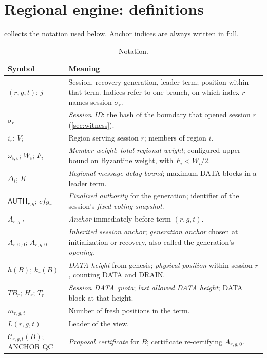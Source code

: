 \documentclass[11pt,a4paper]{article}
\newcommand{\QC}{\mathcal C}
\newcommand{\TB}{\mathit{TB}}
\newcommand{\tagg}[1]{\ensuremath{\mathsf{#1}}}
\newcommand{\defterm}[1]{\textcolor{rrBlue}{\textit{#1}}}
\begin{document}
\section{Regional engine: definitions}
\label{sec:regional}

 collects the notation used below. Anchor indices
are always written in full.
\begin{table}[htbp]\centering\small
\caption{Notation.}\label{tab:notation}
\begin{tabularx}{\linewidth}{@{}p{.29\linewidth}Y@{}}
\toprule Symbol & Meaning\\\midrule
$(r,g,t)$; $j$ & Session, recovery generation, leader term; position
within that term. Indices refer to one branch, on which index $r$ names session $\sigma_r$.\\
$\sigma_r$ & \defterm{Session ID}: the hash of the boundary that opened
session $r$ (\cref{sec:witness}).\\
$i_r$; $V_i$ & Region serving session $r$; members of region $i$.\\
$\omega_{i,v}$; $W_i$; $F_i$ & \defterm{Member weight}; \defterm{total regional weight};
configured upper bound on Byzantine weight, with $F_i<W_i/2$.\\
$\Delta_i$; $K$ & \defterm{Regional message-delay bound}; maximum DATA blocks
in a leader term.\\
$\tagg{AUTH}_{r,g}$; $\mathit{cfg}_r$ & \defterm{Finalized authority} for the
generation; identifier of the session's \defterm{fixed voting snapshot}.\\
$A_{r,g,t}$ & \defterm{Anchor} immediately before term $(r,g,t)$.\\
$A_{r,0,0}$; $A_{r,g,0}$ & \defterm{Inherited session anchor}; \defterm{generation anchor}
chosen at initialization or recovery, also called the generation's
\defterm{opening}.\\
$h(B)$; $k_r(B)$ & \defterm{DATA height} from genesis; \defterm{physical position} within
session $r$, counting DATA and DRAIN.\\
$\TB_r$; $H_r$; $T_r$ & \defterm{Session DATA quota}; \defterm{last allowed DATA height};
DATA block at that height.\\
$m_{r,g,t}$ & Number of fresh positions in the term.\\
$L(r,g,t)$ & Leader of the view.\\
$\QC_{r,g,t}(B)$; ANCHOR QC & \defterm{Proposal certificate} for $B$;
certificate re-certifying $A_{r,g,0}$.\\

\end{tabularx}
\end{table}
\end{document}

